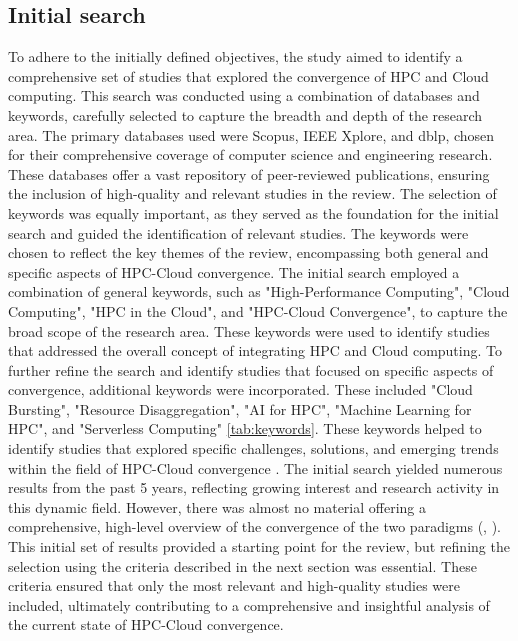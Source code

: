 \subsection{Initial search}
\label{sec:init_search}
    To adhere to the initially defined objectives, the study aimed to identify a comprehensive set of studies that explored the convergence of HPC and Cloud computing. This search was conducted using a combination of databases and keywords, carefully selected to capture the breadth and depth of the research area.
    The primary databases used were Scopus, IEEE Xplore, and dblp, chosen for their comprehensive coverage of computer science and engineering research. These databases offer a vast repository of peer-reviewed publications, ensuring the inclusion of high-quality and relevant studies in the review.
    The selection of keywords was equally important, as they served as the foundation for the initial search and guided the identification of relevant studies. The keywords were chosen to reflect the key themes of the review, encompassing both general and specific aspects of HPC-Cloud convergence.
    The initial search employed a combination of general keywords, such as "High-Performance Computing", "Cloud Computing", "HPC in the Cloud", and "HPC-Cloud Convergence", to capture the broad scope of the research area. These keywords were used to identify studies that addressed the overall concept of integrating HPC and Cloud computing.
    To further refine the search and identify studies that focused on specific aspects of convergence, additional keywords were incorporated. These included "Cloud Bursting", "Resource Disaggregation", "AI for HPC", "Machine Learning for HPC", and "Serverless Computing" \autoref{tab:keywords}. These keywords helped to identify studies that explored specific challenges, solutions, and emerging trends within the field of HPC-Cloud convergence \cite{gadban_analyzing_2022, michelogiannakis_case_2022, copik_software_2024, chahal_isesa_2022, michalewicz_attempt_2023, silva_review_2024, liang_scalable_2022, eberius_evaluating_2023, alves_interference-aware_2020, kolodziej_cloud-based_2019, kabir_uncertainty-aware_2022, reed_hpc_2023}.
    The initial search yielded numerous results from the past 5 years, reflecting growing interest and research activity in this dynamic field. However, there was almost no material offering a comprehensive, high-level overview of the convergence of the two paradigms (\cite{netto_hpc_2019}, \cite{liu_hpc_2022}). This initial set of results provided a starting point for the review, but refining the selection using the criteria described in the next section was essential. These criteria ensured that only the most relevant and high-quality studies were included, ultimately contributing to a comprehensive and insightful analysis of the current state of HPC-Cloud convergence.

